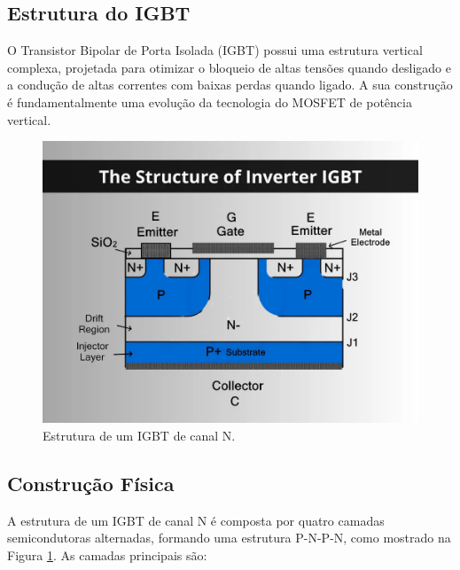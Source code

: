 \documentclass[12pt]{article}
\begin{document}
        \subsection{Estrutura do IGBT}

        O Transistor Bipolar de Porta Isolada (IGBT) possui uma estrutura vertical complexa, projetada para otimizar o bloqueio de altas tensões quando desligado e a condução de altas correntes com baixas perdas quando ligado. A sua construção é fundamentalmente uma evolução da tecnologia do MOSFET de potência vertical.

        \begin{figure}[!h]
            \centering
            \includegraphics[width=0.6\linewidth]{images/The-structure-of-inverter-IGBT.png}
            \caption{Estrutura de um IGBT de canal N.}
            \label{fig:igbt_estrutura}
        \end{figure}

        \subsection{Construção Física}
        A estrutura de um IGBT de canal N é composta por quatro camadas semicondutoras alternadas, formando uma estrutura P-N-P-N, como mostrado na Figura \ref{fig:igbt_estrutura}. As camadas principais são:
\end{document}
